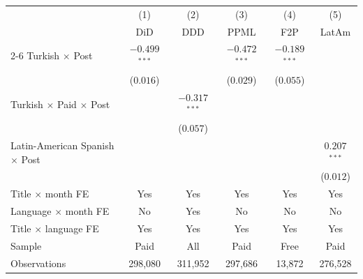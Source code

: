 \begin{tabular}{lccccc}
\toprule
 & (1) & (2) & (3) & (4) & (5) \\
 & DiD & DDD & PPML & F2P & LatAm \\
\cmidrule(lr){2-6}
Turkish $\times$ Post & $-0.499$$^{***}$ &  & $-0.472$$^{***}$ & $-0.189$$^{***}$ &  \\
 & ($0.016$) &  & ($0.029$) & ($0.055$) &  \\[3pt]
Turkish $\times$ Paid $\times$ Post &  & $-0.317$$^{***}$ &  &  &  \\
 &  & ($0.057$) &  &  &  \\[3pt]
Latin-American Spanish $\times$ Post &  &  &  &  & $0.207$$^{***}$ \\
 &  &  &  &  & ($0.012$) \\[3pt]
\midrule
Title $\times$ month FE & Yes & Yes & Yes & Yes & Yes \\
Language $\times$ month FE & No & Yes & No & No & No \\
Title $\times$ language FE & Yes & Yes & Yes & Yes & Yes \\
Sample & Paid & All & Paid & Free & Paid \\
Observations & 298,080 & 311,952 & 297,686 & 13,872 & 276,528 \\
\bottomrule
\end{tabular}
